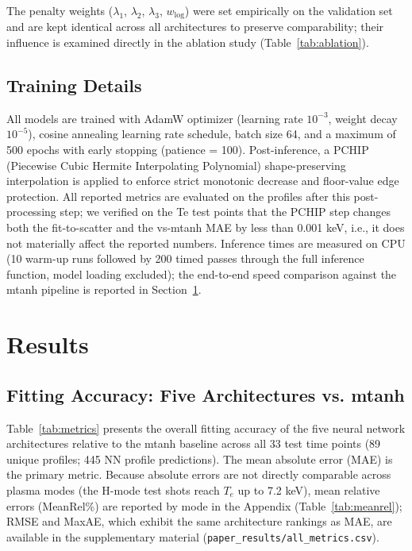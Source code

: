 \documentclass[a4paper,12pt]{article}
\begin{document}
The penalty weights ($\lambda_1$, $\lambda_2$, $\lambda_3$, $w_{\log}$) were set empirically on the validation set and are kept identical across all architectures to preserve comparability; their influence is examined directly in the ablation study (Table~\ref{tab:ablation}).

\subsection{Training Details}

All models are trained with AdamW optimizer (learning rate $10^{-3}$, weight decay $10^{-5}$), cosine annealing learning rate schedule, batch size 64, and a maximum of 500 epochs with early stopping (patience = 100). Post-inference, a PCHIP (Piecewise Cubic Hermite Interpolating Polynomial) shape-preserving interpolation is applied to enforce strict monotonic decrease and floor-value edge protection. All reported metrics are evaluated on the profiles after this post-processing step; we verified on the Te test points that the PCHIP step changes both the fit-to-scatter and the vs-mtanh MAE by less than 0.001 keV, i.e., it does not materially affect the reported numbers. Inference times are measured on CPU (10 warm-up runs followed by 200 timed passes through the full inference function, model loading excluded); the end-to-end speed comparison against the mtanh pipeline is reported in Section~\ref{sec:results}.

\section{Results}
\label{sec:results}

\subsection{Fitting Accuracy: Five Architectures vs. mtanh}

Table~\ref{tab:metrics} presents the overall fitting accuracy of the five neural network architectures relative to the mtanh baseline across all 33 test time points (89 unique profiles; 445 NN profile predictions). The mean absolute error (MAE) is the primary metric. Because absolute errors are not directly comparable across plasma modes (the H-mode test shots reach $T_e$ up to 7.2 keV), mean relative errors (MeanRel\%) are reported by mode in the Appendix (Table~\ref{tab:meanrel}); RMSE and MaxAE, which exhibit the same architecture rankings as MAE, are available in the supplementary material (\texttt{paper\_results/all\_metrics.csv}).
\end{document}
